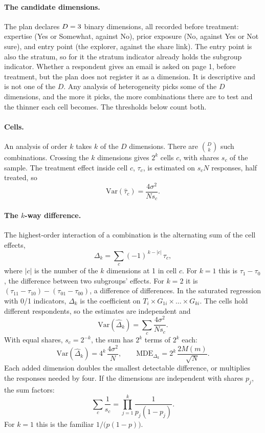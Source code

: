 \documentclass[11pt]{article}
\begin{document}
\paragraph{The candidate dimensions.} The plan declares $D = 3$ binary dimensions, all
recorded before treatment: expertise (Yes or Somewhat, against No), prior exposure (No, against Yes
or Not sure), and entry point (the explorer, against the share link). The entry point is also the
stratum, so for it the stratum indicator already holds the subgroup indicator.
Whether a respondent gives an email is asked on page 1, before treatment, but the plan does not
register it as a dimension. It is descriptive and is not one of the $D$. Any analysis of heterogeneity picks some of the $D$ dimensions, and the more it picks, the
more combinations there are to test and the thinner each cell becomes. The thresholds below count
both.

\paragraph{Cells.} An analysis of order $k$ takes $k$ of the $D$ dimensions. There are
$\binom{D}{k}$ such combinations. Crossing the $k$ dimensions gives $2^k$ cells $c$, with shares
$s_c$ of the sample. The treatment effect inside cell $c$, $\tau_c$, is estimated on $s_c N$
responses, half treated, so
\begin{equation}
  \mathrm{Var}(\hat\tau_c) = \frac{4\sigma^2}{N s_c}. \label{eq:var-cell}
\end{equation}

\paragraph{The $k$-way difference.} The highest-order interaction of a combination is the
alternating sum of the cell effects,
\[
  \Delta_k = \sum_{c} (-1)^{\,k - |c|}\, \tau_c ,
\]
where $|c|$ is the number of the $k$ dimensions at 1 in cell $c$. For $k = 1$ this is
$\tau_1 - \tau_0$, the difference between two subgroups' effects. For $k = 2$ it is
$(\tau_{11} - \tau_{10}) - (\tau_{01} - \tau_{00})$, a difference of differences. In the saturated
regression with 0/1 indicators, $\Delta_k$ is the coefficient on $T_i \times G_{1i} \times \dots
\times G_{ki}$. The cells hold different respondents, so the estimates are independent and
\begin{equation}
  \mathrm{Var}(\hat\Delta_k) = \sum_{c} \frac{4\sigma^2}{N s_c}. \label{eq:var-diff}
\end{equation}
With equal shares, $s_c = 2^{-k}$, the sum has $2^k$ terms of $2^k$ each:
\[
  \mathrm{Var}(\hat\Delta_k) = 4^k \, \frac{4\sigma^2}{N}, \qquad
  \mathrm{MDE}_{\Delta_k} = 2^k \, \frac{2M(m)}{\sqrt{N}}.
\]
Each added dimension doubles the smallest detectable difference, or multiplies the responses
needed by four. If the dimensions are independent with shares $p_j$, the sum factors:
\[
  \sum_c \frac{1}{s_c} = \prod_{j=1}^{k} \frac{1}{p_j(1-p_j)}.
\]
For $k = 1$ this is the familiar $1/\bigl(p(1-p)\bigr)$.
\end{document}
